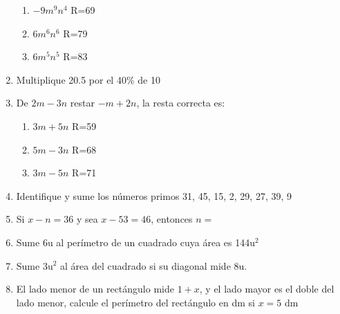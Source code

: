 \documentclass[letterpaper,11pt,twoside]{article}
\begin{document}
\begin{multicols}{2}
\begin{enumerate}
\begin{enumerate}
\item $-9m^{9}n^{4}$ \; R=69
\item $6m^{6}n^{6}$ \; R=79
\item $6m^{5}n^{5}$ \; R=83
\end{enumerate}
\item Multiplique 20.5 por el 40\% de 10
\item De $2m-3n$ restar $-m+2n$, la resta correcta es:
\begin{enumerate}
\item $3m+5n$ \; R=59
\item $5m-3n$ \; R=68
\item $3m-5n$ \; R=71
\end{enumerate}
\item Identifique y sume los números primos 31, 45, 15, 2, 29, 27, 39, 9
\item Si $x-n=36$ \; y sea \; $x-53=46$, entonces $n=$
\item Sume 6u al perímetro de un cuadrado cuya área es 144u$^{2}$
\item Sume 3u$^{2}$ al área del cuadrado si su diagonal mide 8u.
\item El lado menor de un rectángulo mide $1+x$, \; y el lado mayor es el doble del lado menor, calcule el perímetro del rectángulo en dm si $x=5$ dm
\end{enumerate}
\end{multicols}
\end{document}
